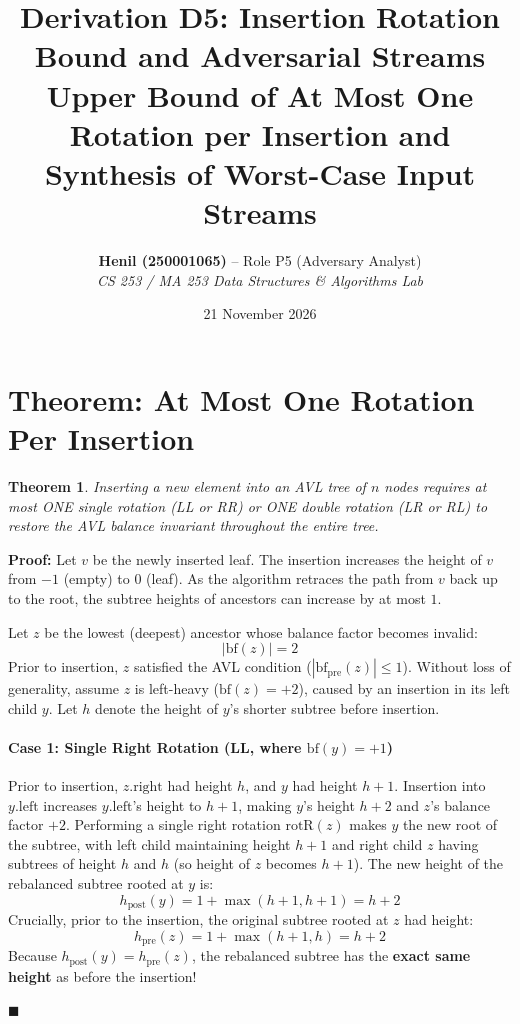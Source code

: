 \documentclass[11pt,a4paper]{article}
\title{\textbf{Derivation D5: Insertion Rotation Bound and Adversarial Streams}\\
\large Upper Bound of At Most One Rotation per Insertion and Synthesis of Worst-Case Input Streams}
\author{\textbf{Henil (250001065)} -- Role P5 (Adversary Analyst)\\
\textit{CS 253 / MA 253 Data Structures \& Algorithms Lab}}
\date{21 November 2026}
\newtheorem{theorem}{Theorem}
\newenvironment{proof}{\noindent\textbf{Proof:}\enspace}{\hfill$\blacksquare$\par\medskip}
\begin{document}
\maketitle

\section{Theorem: At Most One Rotation Per Insertion}
\begin{theorem}
Inserting a new element into an AVL tree of $n$ nodes requires at most ONE single rotation (LL or RR) or ONE double rotation (LR or RL) to restore the AVL balance invariant throughout the entire tree.
\end{theorem}
\begin{proof}
Let $v$ be the newly inserted leaf. The insertion increases the height of $v$ from $-1$ (empty) to $0$ (leaf). As the algorithm retraces the path from $v$ back up to the root, the subtree heights of ancestors can increase by at most $1$.

Let $z$ be the lowest (deepest) ancestor whose balance factor becomes invalid:
\begin{equation}
|\text{bf}(z)| = 2
\end{equation}
Prior to insertion, $z$ satisfied the AVL condition ($|\text{bf}_{\text{pre}}(z)| \le 1$). Without loss of generality, assume $z$ is left-heavy ($\text{bf}(z) = +2$), caused by an insertion in its left child $y$. Let $h$ denote the height of $y$'s shorter subtree before insertion.

\paragraph{Case 1: Single Right Rotation (LL, where $\text{bf}(y) = +1$)}
Prior to insertion, $z.\text{right}$ had height $h$, and $y$ had height $h+1$. Insertion into $y.\text{left}$ increases $y.\text{left}$'s height to $h+1$, making $y$'s height $h+2$ and $z$'s balance factor $+2$.
Performing a single right rotation $\text{rotR}(z)$ makes $y$ the new root of the subtree, with left child maintaining height $h+1$ and right child $z$ having subtrees of height $h$ and $h$ (so height of $z$ becomes $h+1$).
The new height of the rebalanced subtree rooted at $y$ is:
\begin{equation}
h_{\text{post}}(y) = 1 + \max(h+1, h+1) = h + 2
\end{equation}
Crucially, prior to the insertion, the original subtree rooted at $z$ had height:
\begin{equation}
h_{\text{pre}}(z) = 1 + \max(h+1, h) = h + 2
\end{equation}
Because $h_{\text{post}}(y) = h_{\text{pre}}(z)$, the rebalanced subtree has the \textbf{exact same height} as before the insertion!


\end{proof}
\end{document}
